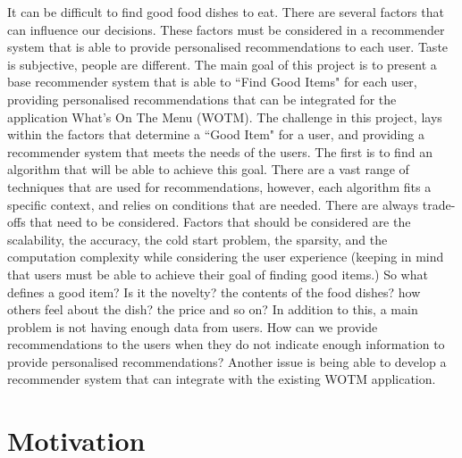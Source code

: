 It can be difficult to find good food dishes to eat. There are several factors that can influence our decisions. These factors must be considered in a recommender system that is able to provide personalised recommendations to each user. Taste is subjective, people are different.  The main goal of this project is to present a base recommender system that is able to ``Find Good Items" for each user, providing personalised recommendations that can be integrated for the application What's On The Menu (WOTM). The challenge in this project, lays within the factors that determine a ``Good Item" for a user, and providing a recommender system that meets the needs of the users. The first is to find an algorithm that will be able to achieve this goal. There are a vast range of techniques that are used for recommendations, however, each algorithm fits a specific context, and relies on conditions that are needed. There are always trade-offs that need to be considered. Factors that should be considered are the scalability, the accuracy, the cold start problem, the sparsity, and the computation complexity while considering the user experience (keeping in mind that users must be able to achieve their goal of finding good items.) So what defines a good item? Is it the novelty? the contents of the food dishes? how others feel about the dish? the price and so on? In addition to this, a main problem is not having enough data from users. How can we provide recommendations to the users when they do not indicate enough information to provide personalised recommendations? Another issue is being able to develop a recommender system that can integrate with the existing WOTM application. 

\section{Motivation}


